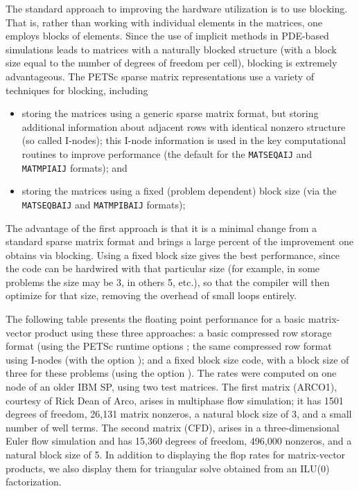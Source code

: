 The standard approach to improving the hardware utilization is to use
blocking. That is, rather than working with individual elements in
the matrices, one employs blocks of elements.  Since the use of
implicit methods in PDE-based simulations leads to matrices with a
naturally blocked structure (with a block size equal to the number of
degrees of freedom per cell), blocking is extremely advantageous.  The
PETSc sparse matrix representations use a variety
of techniques for blocking, including

\begin{itemize}
\item storing the matrices using a generic sparse matrix format, but
   storing additional information about adjacent rows with identical
   nonzero structure (so called I-nodes); this I-node information is
   used in the key computational routines to improve performance
    (the default for the \lstinline{MATSEQAIJ} and \lstinline{MATMPIAIJ} formats); and
\item storing the matrices using a fixed (problem dependent) block size
  (via the \lstinline{MATSEQBAIJ} and \lstinline{MATMPIBAIJ} formats);
\end{itemize}

The advantage of the first approach is that it is a minimal change
from a standard sparse matrix format and brings a large percent of the
improvement one obtains via blocking.  Using a fixed block size gives
the best performance, since the code can be hardwired with that
particular size (for example, in some problems the size may be 3, in
others 5, etc.), so that the compiler will then optimize for that
size, removing the overhead of small loops entirely.

The following table presents the floating point performance
for a basic matrix-vector product using these three approaches: a basic
compressed row storage format (using the PETSc runtime options
; the same compressed row format using
I-nodes (with the option ); and a fixed block size code,
with a block size of three for these problems (using the option
). The rates were computed on one
node of an older IBM SP, using two test matrices.  The first matrix
(ARCO1), courtesy of Rick Dean of Arco, arises in multiphase flow
simulation; it has 1501 degrees of freedom, 26,131 matrix nonzeros,
 a natural block size of 3, and a small number of well terms. The
second matrix (CFD), arises in a three-dimensional Euler flow
simulation and has 15,360 degrees of freedom, 496,000 nonzeros, and a
natural block size of 5. In addition to displaying the flop rates for
matrix-vector products, we also display them for triangular solve
obtained from an ILU(0) factorization.

